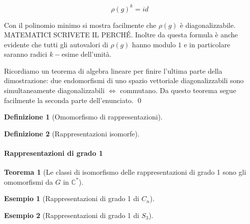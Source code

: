 \documentclass[11pt]{article}
\theoremstyle{plain}
\newtheorem{thm}{Teorema}[section]
\theoremstyle{definition}
\newtheorem{defn}{Definizione}[section]
\newtheorem{exmp}{Esempio}[section]
\theoremstyle{remark}
\newcommand{\C}{\mathbb{C}}
\begin{document}
\[ \rho(g)^k = id\]

Con il polinomio minimo si mostra facilmente che $\rho(g)$ è diagonalizzabile. MATEMATICI SCRIVETE IL PERCH\'E. Inoltre da questa formula è anche evidente che tutti gli autovalori di $\rho(g)$ hanno modulo $1$ e in particolare saranno radici $k-$esime dell'unità.

Ricordiamo un teorema di algebra lineare per finire l'ultima parte della dimostrazione: due endomorfismi di uno spazio vettoriale diagonalizzabili sono simultaneamente diagonalizzabili $\Leftrightarrow$ commutano. Da questo teorema segue facilmente la seconda parte dell'enunciato. \qed





\begin{defn}[Omomorfismo di rappresentazioni] 




\end{defn}



\begin{defn}[Rappresentazioni isomorfe]


\end{defn}




\paragraph{Rappresentazioni di grado 1}

\begin{thm}[Le classi di isomorfismo delle rappresentazioni di grado 1 sono gli omomorfismi da $G$ in $\C^*$]


\end{thm}


\begin{exmp}[Rappresentazioni di grado 1 di $C_n$]

\end{exmp}


\begin{exmp}[Rappresentazioni di grado 1 di $S_3$]

\end{exmp}
\end{document}
